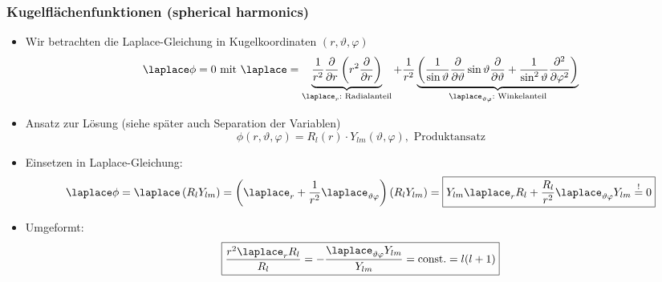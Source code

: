 \begin{frame}
{    }

  \end{frame}

  \begin{frame}
    \frametitle{Kugelflächenfunktionen (spherical harmonics)}
    \begin{itemize}[<+->]
    \item Wir betrachten die Laplace-Gleichung in Kugelkoordinaten $(r, \vartheta,\varphi)$
      $$
      \laplace \phi = 0 \text{ mit } \laplace = \underbrace{\frac{1}{r^2}\frac{\partial}{\partial r} \left( r^2 \frac{\partial}{\partial r} \right)}_{\laplace_r: \text{ Radialanteil}} + \frac{1}{r^2} \underbrace{\left( \frac{1}{\sin\vartheta} \frac{\partial}{\partial\vartheta} \sin\vartheta \frac{\partial}{\partial\vartheta} + \frac{1}{\sin^2\vartheta} \frac{\partial^2}{\partial\varphi^2}  \right)}_{\laplace_{\vartheta\varphi}: \text{ Winkelanteil}}
      $$
    \item Ansatz zur Lösung (siehe später auch \alert{Separation der Variablen})
      $$
      \phi(r,\vartheta,\varphi) = R_l(r) \cdot Y_{lm} (\vartheta,\varphi), \text{ Produktansatz}
      $$
    \item Einsetzen in Laplace-Gleichung:
      $$
      \laplace \phi = \laplace\left( R_l Y_{lm}\right) = \left(\laplace_r + \frac{1}{r^2}\laplace_{\vartheta\varphi}\right) \left( R_l Y_{lm}\right) = \boxed{Y_{lm} \laplace_r R_l + \frac{R_l}{r^2}\laplace_{\vartheta\varphi} Y_{lm} \stackrel{!}{=} 0}
      $$
    \item Umgeformt:
      $$
      \boxed{\frac{r^2\laplace_rR_l}{R_l} = - \frac{\laplace_{\vartheta\varphi} Y_{lm}}{Y_{lm}} = \text{const.} = l(l+1)}
      $$
      \end{itemize}
    \end{frame}
  
